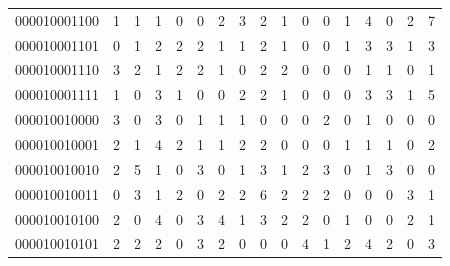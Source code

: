 \documentclass[10pt,a4paper]{article}
\begin{document}
\begin{longtable}{ |c|c|c|c|c|c|c|c|c|c|c|c|c|c|c|c|c| }
    000010001100              & 1                            & 1                                & 1                            & 0                              & 0   & 2   & 3   & 2   & 1   & 0   & 0   & 1   & 4   & 0   & 2   & 7   \\
    000010001101              & 0                            & 1                                & 2                            & 2                              & 2   & 1   & 1   & 2   & 1   & 0   & 0   & 1   & 3   & 3   & 1   & 3   \\
    000010001110              & 3                            & 2                                & 1                            & 2                              & 2   & 1   & 0   & 2   & 2   & 0   & 0   & 0   & 1   & 1   & 0   & 1   \\
    000010001111              & 1                            & 0                                & 3                            & 1                              & 0   & 0   & 2   & 2   & 1   & 0   & 0   & 0   & 3   & 3   & 1   & 5   \\
    000010010000              & 3                            & 0                                & 3                            & 0                              & 1   & 1   & 1   & 0   & 0   & 0   & 2   & 0   & 1   & 0   & 0   & 0   \\
    000010010001              & 2                            & 1                                & 4                            & 2                              & 1   & 1   & 2   & 2   & 0   & 0   & 0   & 1   & 1   & 1   & 0   & 2   \\
    000010010010              & 2                            & 5                                & 1                            & 0                              & 3   & 0   & 1   & 3   & 1   & 2   & 3   & 0   & 1   & 3   & 0   & 0   \\
    000010010011              & 0                            & 3                                & 1                            & 2                              & 0   & 2   & 2   & 6   & 2   & 2   & 2   & 0   & 0   & 0   & 3   & 1   \\
    000010010100              & 2                            & 0                                & 4                            & 0                              & 3   & 4   & 1   & 3   & 2   & 2   & 0   & 1   & 0   & 0   & 2   & 1   \\
    000010010101              & 2                            & 2                                & 2                            & 0                              & 3   & 2   & 0   & 0   & 0   & 4   & 1   & 2   & 4   & 2   & 0   & 3   \\

\end{longtable}
\end{document}
